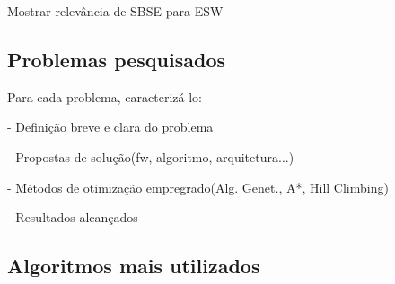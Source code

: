 Mostrar relevância de SBSE para ESW

\subsection{Problemas pesquisados}

Para cada problema, caracterizá-lo:

- Definição breve e clara do problema

- Propostas de solução(fw, algoritmo, arquitetura...)

- Métodos de otimização empregrado(Alg. Genet., A*, Hill Climbing)

- Resultados alcançados

\subsection{Algoritmos mais utilizados}







